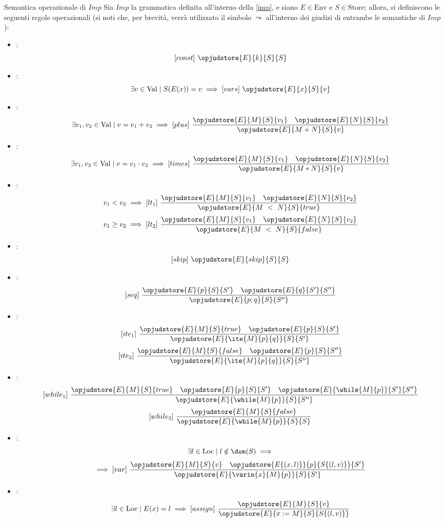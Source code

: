 \documentclass[a4paper, 12pt]{report}
\begin{document}
    \begin{framedprop}[label={imp sem},breakable]{Semantica operazionale di $Imp$}
        Sia $Imp$ la grammatica definita all'interno della \cref{imp}, e siano $E \in \mathrm{Env}$ e $S \in \mathrm{Store}$; allora, si definiscono le seguenti regole operazionali (si noti che, per brevità, verrà utilizzato il simbolo $\leadsto$ all'interno dei giudizi di entrambe le semantiche di $Imp$):

        \begin{itemize}
            \item {}: $$[const] \ \opjudstore{E}{k}{S}{S}$$
            \item {}: $$\exists v \in \mathrm{Val} \mid S(E(x)) = v \implies [vars] \ \opjudstore{E}{x}{S}{v}$$
            \item {}: $$\exists v_1, v_2 \in \mathrm{Val} \mid v = v_1 + v_2 \implies [plus] \ \dfrac{\opjudstore{E}{M}{S}{v_1} \quad \opjudstore{E}{N}{S}{v_2}}{\opjudstore{E}{M + N}{S}{v}}$$
            \item {}: $$\exists v_1, v_2 \in \mathrm{Val} \mid v = v_1 \cdot v_2 \implies [times] \ \dfrac{\opjudstore{E}{M}{S}{v_1} \quad \opjudstore{E}{N}{S}{v_2}}{\opjudstore{E}{M * N}{S}{v}}$$
            \item {}: $$v_1 < v_2 \implies [lt_1] \ \dfrac{\opjudstore{E}{M}{S}{v_1} \quad \opjudstore{E}{N}{S}{v_2}}{\opjudstore{E}{M \ < \ N}{S}{true}}$$ $$v_1 \ge v_2 \implies [lt_2] \ \dfrac{\opjudstore{E}{M}{S}{v_1} \quad \opjudstore{E}{N}{S}{v_2}}{\opjudstore{E}{M \ < \ N}{S}{false}}$$
            \item {}: $$[skip] \ \opjudstore{E}{skip}{S}{S}$$
            \item {}: $$[seq] \ \dfrac{\opjudstore{E}{p}{ S}{S'} \quad \opjudstore{E}{q}{ S'}{S''}}{\opjudstore{E}{p;q}{S}{S''}}$$
            \item {}: $$[ite_1] \ \dfrac{\opjudstore{E}{M}{ S}{true} \quad \opjudstore{E}{p}{S}{S'}}{\opjudstore{E}{\ite{M}{p}{q}}{S}{S'}}$$ $$[ite_2] \ \dfrac{\opjudstore{E}{M}{S}{false} \quad \opjudstore{E}{p}{S}{S''}}{\opjudstore{E}{\ite{M}{p}{q}}{S}{S''}}$$
            \item {}: $$[while_1] \ \dfrac{\opjudstore{E}{M}{S}{true} \quad \opjudstore{E}{p}{S}{S'} \quad \opjudstore{E}{\while{M}{p}}{ S'}{S''}}{\opjudstore{E}{\while{M}{p}}{ S}{S''}}$$ $$[while_2] \ \dfrac{\opjudstore{E}{M}{S}{false}}{\opjudstore{E}{\while{M}{p}}{S}{S}}$$
            \item {}: $$\exists l \in \mathrm{Loc} \mid l \notin \dom(S) \implies$$ $$\implies [var] \ \dfrac{\opjudstore{E}{M}{S}{v} \quad \opjudstore{E\{(x,l)\}}{p}{S\{(l,v)\}}{S'}}{\opjudstore{E}{\varin{x}{M}{p}}{S}{S'}}$$
            \item {}: $$\exists l \in \mathrm{Loc} \mid E(x) = l \implies [assign] \ \dfrac{\opjudstore{E}{M}{S}{v}}{\opjudstore{E}{x := M}{ S}{S\{(l, v)\}}}$$
        \end{itemize}
    \end{framedprop}
\end{document}
